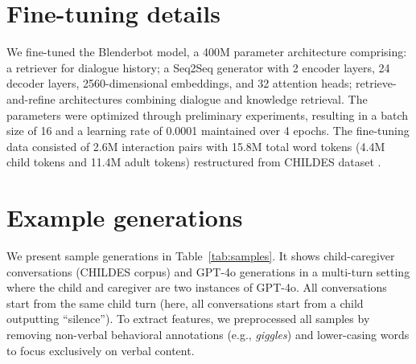 \section{Fine-tuning details}
\label{sec:benchmark_finetuning}
We fine-tuned the Blenderbot model, a 400M parameter architecture comprising: a retriever for dialogue history; a Seq2Seq generator with 2 encoder layers, 24 decoder layers, 2560-dimensional embeddings, and 32 attention heads; retrieve-and-refine architectures combining dialogue and knowledge retrieval. The parameters were optimized through preliminary experiments, resulting in a batch size of 16 and a learning rate of 0.0001 maintained over 4 epochs. The fine-tuning data consisted of 2.6M interaction pairs with 15.8M total word tokens (4.4M child tokens and 11.4M adult tokens) restructured from CHILDES dataset \citep{macwhinney2000childes}.

\section{Example generations}
\label{sec:benchmark_examples}


We present sample generations in Table~\ref{tab:samples}. It shows child-caregiver conversations (CHILDES corpus) and GPT-4o generations in a multi-turn setting where the child and caregiver are two instances of GPT-4o. All conversations start from the same child turn (here, all conversations start from a child outputting ``silence''). To extract features, we preprocessed all samples by removing non-verbal behavioral annotations (e.g., \textit{giggles}) and lower-casing words to focus exclusively on verbal content. 

